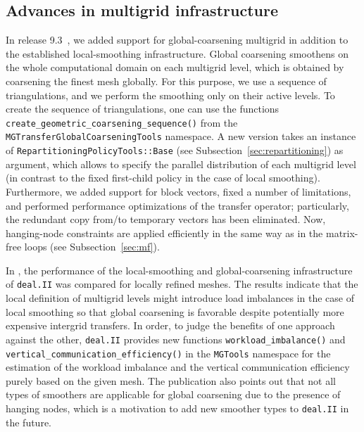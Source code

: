 \documentclass{ansarticle-preprint}
\newcommand{\specialword}[1]{\texttt{#1}}
\newcommand{\dealii}{{\specialword{deal.II}}\xspace}
\begin{document}
%
%
%
%  
%


\subsection{Advances in multigrid infrastructure}\label{sec:multigrid}

In release 9.3~\cite{dealII93}, we added support for global-coarsening multigrid in 
addition to the established local-smoothing infrastructure. Global 
coarsening smoothens on the whole computational domain on each
multigrid level, which is obtained by coarsening the finest mesh globally.
For this purpose, we use a sequence of triangulations, and we perform
the smoothing only on their active levels. To create the sequence of 
triangulations, one can use the functions \texttt{create\_geometric\_coarsening\_sequence()} from the
\texttt{MGTransferGlobalCoarseningTools} namespace. A new version takes an 
instance of \texttt{RepartitioningPolicyTools::Base} (see Subsection~\ref{sec:repartitioning}) as argument, which allows to specify the parallel 
distribution of each multigrid level (in contrast to the fixed first-child policy in the case of local smoothing). Furthermore, we added support for block vectors,
fixed a number of limitations, and performed performance optimizations of 
the transfer operator; particularly, the redundant copy from/to temporary vectors
has been eliminated. Now, hanging-node constraints are applied
efficiently in the same way as in the matrix-free loops (see Subsection~\ref{sec:mf}).

In \cite{munch2022gc}, the performance of the local-smoothing and global-coarsening
infrastructure of \texttt{deal.II} was compared for locally refined meshes. The results indicate that
the local definition of multigrid levels might introduce load imbalances
in the case of local smoothing so that global coarsening is favorable despite
potentially more expensive intergrid transfers. In order, to judge the benefits
of one approach against the other, \texttt{deal.II} provides new functions
\texttt{workload\_imbalance()} and \texttt{vertical\_communication\_efficiency()} 
in the \texttt{MGTools} namespace for the  estimation of the workload imbalance and the
vertical communication efficiency purely based on the given mesh. The publication \cite{munch2022gc} also points out that not
all types of smoothers are applicable for global coarsening due to the
presence of hanging nodes, which is a motivation to add new smoother types
to \dealii in the future.
\end{document}
